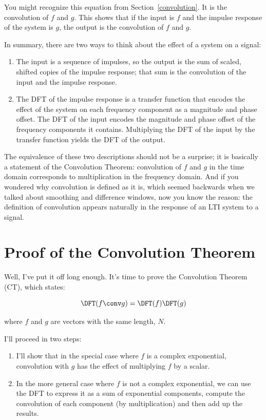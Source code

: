 \documentclass[12pt]{book}
\begin{document}
You might recognize this equation from Section~\ref{convolution}.  It
is the convolution of $f$ and $g$.  This shows that if the input is $f$
and the impulse response of the system is $g$, the output is the
convolution of $f$ and $g$.

In summary, there are two ways to think about the effect of a system
on a signal:

\begin{enumerate}

\item The input is a sequence of impulses, so the output is the sum of
  scaled, shifted copies of the impulse response; that sum is the
  convolution of the input and the impulse response.

\item The DFT of the impulse response is a transfer function that
  encodes the effect of the system on each frequency component as a
  magnitude and phase offset.  The DFT of the input encodes the
  magnitude and phase offset of the frequency components it contains.
  Multiplying the DFT of the input by the transfer function yields
  the DFT of the output.

\end{enumerate}

The equivalence of these two descriptions should not be a surprise;
it is basically a statement of the Convolution Theorem:
convolution of $f$ and $g$ in the time
domain corresponds to multiplication in the frequency domain.
And if you wondered why convolution is defined as it is, which
seemed backwards when we talked about smoothing and difference
windows, now you know the reason: the definition of convolution
appears naturally in the response of an LTI system to a signal.


\section{Proof of the Convolution Theorem}

Well, I've put it off long enough.  It's time to prove the Convolution
Theorem (CT), which states:

\[ \DFT(f \conv g) = \DFT(f) \DFT(g) \]

where $f$ and $g$ are vectors with the same length, $N$.

I'll proceed in two steps:

\begin{enumerate}

\item I'll show that in the special case where $f$ is a complex
exponential, convolution with $g$ has the effect of multiplying
$f$ by a scalar.  

\item In the more general case where $f$ is not a complex exponential,
we can use the DFT to express it as a sum of exponential components,
compute the convolution of each component (by multiplication) and
then add up the results.

\end{enumerate}
\end{document}
